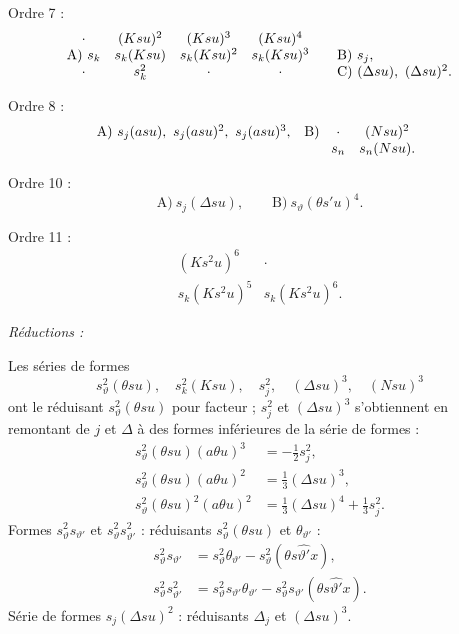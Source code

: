 \documentclass[11pt]{article}
\begin{document}
\noindent Ordre 7 :
\[
\begin{array}{c@{\quad}c@{\quad}c@{\quad}c@{\qquad}l}
\cdot&(Ksu)^2&(Ksu)^3&(Ksu)^4&\\
\text{A)}\ s_k&s_k(Ksu)&s_k(Ksu)^2&s_k(Ksu)^3&
\text{B)}\ s_j,\\
\cdot&s_k^2&\cdot&\cdot&
\text{C)}\ (\Delta su),\ (\Delta su)^2.
\end{array}
\]

\noindent Ordre 8 :
\[
\begin{array}{ll}
\text{A)}\ s_j(asu),\ s_j(asu)^2,\ s_j(asu)^3,
&
\text{B)}\ \begin{array}[t]{cc}
\cdot&(Nsu)^2\\
s_n&s_n(Nsu).
\end{array}
\end{array}
\]

\noindent Ordre 10 :
\[
\text{A)}\ s_j(\Delta su),\qquad \text{B)}\ s_\vartheta(\theta s'u)^4.
\]

\noindent Ordre 11 :
\[
\begin{array}{cc}
(Ks^2u)^6&\cdot\\
s_k(Ks^2u)^5&s_k(Ks^2u)^6.
\end{array}
\]

\noindent\emph{Réductions :}

Les séries de formes
\[
 s_\vartheta^2(\theta su),\quad s_k^2(Ksu),\quad s_j^2,\quad (\Delta su)^3,\quad (Nsu)^3
\]
ont le réduisant $s_\vartheta^2(\theta su)$ pour facteur ; $s_j^2$ et $(\Delta su)^3$ s'obtiennent en remontant de $j$ et $\Delta$ à des formes inférieures de la série de formes :
\[
\begin{aligned}
s_\vartheta^2(\theta su)(a\theta u)^3&=-\frac12s_j^2,\\
s_\vartheta^2(\theta su)(a\theta u)^2&=\frac13(\Delta su)^3,\\
s_\vartheta^2(\theta su)^2(a\theta u)^2&=\frac13(\Delta su)^4+\frac13s_j^2.
\end{aligned}
\]
Formes $s_\vartheta^2s_{\vartheta'}$ et $s_\vartheta^2s_{\vartheta'}^2$ : réduisants $s_\vartheta^2(\theta su)$ et $\theta_{\vartheta'}$ :
\[
\begin{aligned}
s_\vartheta^2s_{\vartheta'}&=s_\vartheta^2\theta_{\vartheta'}-s_\vartheta^2(\theta s\widehat{\vartheta'}x),\\
s_\vartheta^2s_{\vartheta'}^2&=s_\vartheta^2s_{\vartheta'}\theta_{\vartheta'}-s_\vartheta^2s_{\vartheta'}(\theta s\widehat{\vartheta'}x).
\end{aligned}
\]
Série de formes $s_j(\Delta su)^2$ : réduisants $\Delta_j$ et $(\Delta su)^3$.
\end{document}
